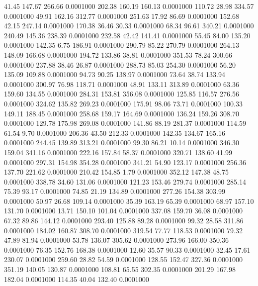   41.45  147.67  266.66   0.0001000
 202.38  160.19  160.13   0.0001000
 110.72   28.98  334.57   0.0001000
  49.91  162.16  312.77   0.0001000
 251.63   17.92   86.69   0.0001000
 152.68   42.15  247.14   0.0001000
 170.38   36.46   30.33   0.0001000
  68.34   96.61  340.21   0.0001000
 240.49  145.36  238.39   0.0001000
 232.58   42.42  141.41   0.0001000
  55.45   84.00  135.20   0.0001000
 142.35    6.75  186.91   0.0001000
 290.79   85.22  270.79   0.0001000
 264.13  148.09  166.68   0.0001000
 194.72  133.86   38.81   0.0001000
 351.53   78.24  300.66   0.0001000
 237.88   38.46   26.87   0.0001000
 288.73   85.03  254.30   0.0001000
  56.20  135.09  109.88   0.0001000
  94.73   90.25  138.97   0.0001000
  73.64   38.74  133.94   0.0001000
 300.97   76.98  118.71   0.0001000
  48.91  133.11  313.89   0.0001000
  63.36  159.60  134.55   0.0001000
 284.31  153.81  356.08   0.0001000
 125.85  116.57  276.56   0.0001000
 324.62  135.82  269.23   0.0001000
 175.91   98.06   73.71   0.0001000
 100.33  149.11  188.45   0.0001000
 258.68  159.17  164.69   0.0001000
 136.24  159.26  308.70   0.0001000
 129.78  175.98  269.08   0.0001000
 141.86   88.19  281.37   0.0001000
 114.59   61.54    9.70   0.0001000
 206.36   43.50  212.33   0.0001000
 142.35  134.67  165.16   0.0001000
 244.45  139.89  313.21   0.0001000
  99.30   86.21   10.14   0.0001000
 346.30  159.04  341.16   0.0001000
 222.16  157.84   58.37   0.0001000
 320.71  138.60   41.99   0.0001000
 297.31  154.98  354.28   0.0001000
 341.21   54.90  123.17   0.0001000
 256.36  137.70  221.62   0.0001000
 210.42  154.85    1.79   0.0001000
 352.12  147.38   48.75   0.0001000
 338.78   34.60  131.06   0.0001000
 121.23  153.46  279.74   0.0001000
 285.14   75.39   93.17   0.0001000
  74.85   21.19  134.89   0.0001000
 277.26  154.38  303.99   0.0001000
  50.97   26.68  109.14   0.0001000
  35.39  163.19   65.39   0.0001000
  68.97  157.10  131.70   0.0001000
  13.71  150.10  101.04   0.0001000
 337.08  159.70   36.08   0.0001000
  67.32   89.86  144.12   0.0001000
 293.40  125.88   89.28   0.0001000
  99.32   28.58  311.86   0.0001000
 184.02  160.87  308.70   0.0001000
 319.54   77.77  118.53   0.0001000
  79.32   47.89   81.94   0.0001000
  53.78  136.07  305.62   0.0001000
 273.96  166.00  350.36   0.0001000
  76.35  152.76  168.38   0.0001000
  12.60   35.57   90.33   0.0001000
  32.45   17.61  230.07   0.0001000
 259.60   28.82   54.59   0.0001000
 128.55  152.47  327.36   0.0001000
 351.19  140.05  130.87   0.0001000
 108.81   65.55  302.35   0.0001000
 201.29  167.98  182.04   0.0001000
 114.35   40.04  132.40   0.0001000
